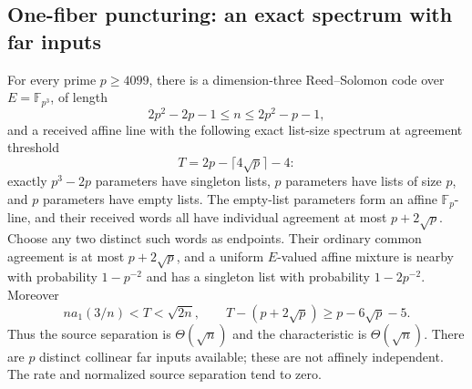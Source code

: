 \subsection{One-fiber puncturing: an exact spectrum with far inputs}
\label{sec:fp3-far-endpoints}

\begin{theorem}\label{thm:fp3-far-endpoints}
For every prime $p\ge4099$, there is a dimension-three Reed--Solomon
code over $E=\mathbb F_{p^3}$, of length
\[
 2p^2-2p-1\le n\le2p^2-p-1,
\]
and a received affine line with the following exact list-size spectrum
at agreement threshold
\[
 T=2p-\lceil4\sqrt p\rceil-4:
\]
exactly $p^3-2p$ parameters have singleton lists, $p$ parameters have
lists of size $p$, and $p$ parameters have empty lists. The empty-list
parameters form an affine $\mathbb F_p$-line, and their received words
all have individual agreement at most $p+2\sqrt p$.
Choose any two distinct such words as endpoints. Their ordinary common
agreement is at most $p+2\sqrt p$, and a uniform $E$-valued affine
mixture is nearby with probability $1-p^{-2}$ and has a singleton list
with probability $1-2p^{-2}$. Moreover
\[
 n a_1(3/n)<T<\sqrt{2n},\qquad
 T-(p+2\sqrt p)\ge p-6\sqrt p-5.
\]
Thus the source separation is $\Theta(\sqrt n)$ and the characteristic
is $\Theta(\sqrt n)$. There are $p$ distinct collinear far inputs
available; these are not affinely independent. The rate and normalized
source separation tend to zero.
\end{theorem}

